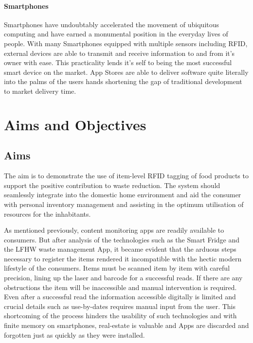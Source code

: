 \documentclass[a4paper, 11pt]{article}
\begin{document}
\paragraph{Smartphones}Smartphones have undoubtably accelerated the movement of ubiquitous computing and have earned a monumental position in the everyday lives of people. With many Smartphones equipped with multiple sensors including RFID, external devices are able to transmit and receive information to and from it's owner with ease. This practicality lends it's self to being the most successful smart device on the market. App Stores are able to deliver software quite literally into the palms of the users hands shortening the gap of traditional development to market delivery time. 

\clearpage

\section{Aims and Objectives}
\subsection{Aims}

The aim is to demonstrate the use of item-level RFID tagging of food products to support the positive contribution to waste reduction. The system should seamlessly integrate into the domestic home environment and aid the consumer with personal inventory management and assisting in the optimum utilisation of resources for the inhabitants. 

As mentioned previously, content monitoring apps are readily available to consumers. But after analysis of the technologies such as the Smart Fridge and the LFHW waste management App, it became evident that the arduous steps necessary to register the items rendered it incompatible with the hectic modern lifestyle of the consumers. Items must be scanned item by item with careful precision, lining up the laser and barcode for a successful reads. If there are any obstructions the item will be inaccessible and manual intervention is required. Even after a successful read the information accessible digitally is limited and crucial details such as use-by-dates requires manual input from the user. This shortcoming of the process hinders the usability of such technologies and with finite memory on smartphones, real-estate is valuable and Apps are discarded and forgotten just as quickly as they were installed.
\end{document}
